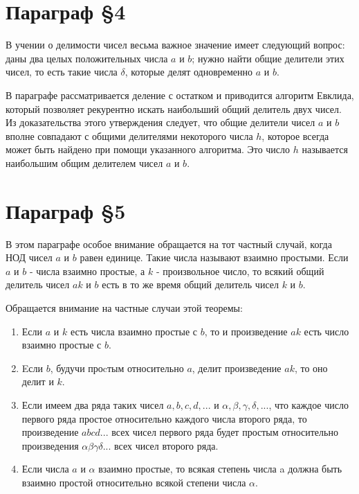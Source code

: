 \section{Параграф \S 4}

В учении о делимости чисел весьма важное значение имеет следующий вопрос: даны два целых положительных числа $a$ и $b$; нужно найти общие делители этих чисел, то есть такие числа $\delta$, которые делят одновременно $a$ и $b$.

В параграфе рассматривается деление с остатком и приводится алгоритм Евклида, который позволяет рекурентно искать наибольший общий делитель двух чисел. Из доказательства этого утверждения следует, что общие делители чисел $a$ и $b$ вполне совпадают с общими делителями некоторого числа $h$, которое всегда может быть найдено при помощи указанного алгоритма. Это число $h$ называется наибольшим общим делителем чисел $a$ и $b$.

\section{Параграф \S 5}

В этом параграфе особое внимание обращается на тот частный случай, когда НОД чисел $a$ и $b$ равен единице. Такие числа называют взаимно простыми. Если $a$ и $b$ - числа взаимно простые, а $k$ - произвольное число, то всякий общий делитель чисел $ak$ и $b$ есть в то же время общий делитель чисел $k$ и $b$.

Обращается внимание на частные случаи этой теоремы:

\begin{enumerate}
    \item Если $a$ и $k$ есть числа взаимно простые с $b$, то и произведение $ak$ есть число взаимно простые с $b$.
    \item Eсли $b$, будучи проcтым относительно $a$, делит произведение $ak$, то оно делит и $k$.
    \item Если имеем два ряда таких чисел $a,b,c,d,...$ и $\alpha, \beta, \gamma, \delta,...$, что каждое число первого ряда простое относительно каждого числа второго ряда, то произведение $abcd ...$ всех чисел первого ряда будет простым относительно произведения $\alpha\beta\gamma\delta...$ всех чисел второго ряда.
    \item Если числа $a$ и $\alpha$ взаимно простые, то всякая степень числа a должна быть взаимно простой относительно всякой степени числа $\alpha$.
\end{enumerate}

